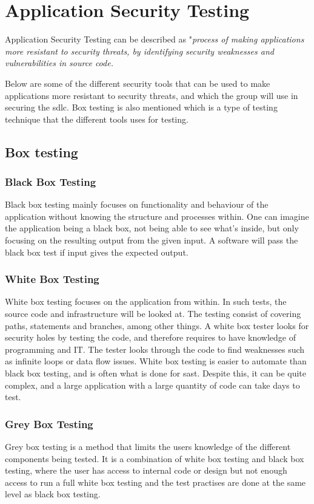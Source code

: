 \section{Application Security Testing}
Application Security Testing can be described as "\textit{process of making applications more resistant to security threats, by identifying security weaknesses and vulnerabilities in source code.}\cite{AST}

Below are some of the different security tools that can be used to make applications more resistant to security threats, and which the group will use in securing the \acrshort{sdlc}. Box testing is also mentioned which is a type of testing technique that the different tools uses for testing.  

\subsection{Box testing}
\label{boxtesting}

\subsubsection{Black Box Testing}
Black box testing mainly focuses on functionality and behaviour of the application without knowing the structure and processes within. One can imagine the application being a black box, not being able to see what's inside, but only focusing on the resulting output from the given input. A software will pass the black box test if input gives the expected output. \cite{blackbox}

\subsubsection{White Box Testing}
White box testing focuses on the application from within. In such tests, the source code and infrastructure will be looked at. The testing consist of covering paths, statements and branches, among other things. A white box tester looks for security holes by testing the code, and therefore requires to have knowledge of programming and IT. The tester looks through the code to find weaknesses such as infinite loops or data flow issues. White box testing is easier to automate than black box testing, and is often what is done for \acrlong{sast}. Despite this, it can be quite complex, and a large application with a large quantity of code can take days to test. \cite{whitebox}

\subsubsection{Grey Box Testing}
Grey box testing is a method that limits the users knowledge of the different components being tested. It is a combination of white box testing and black box testing, where the user has access to internal code or design but not enough access to run a full white box testing and the test practises are done at the same level as black box testing. \cite{GreyBox}


